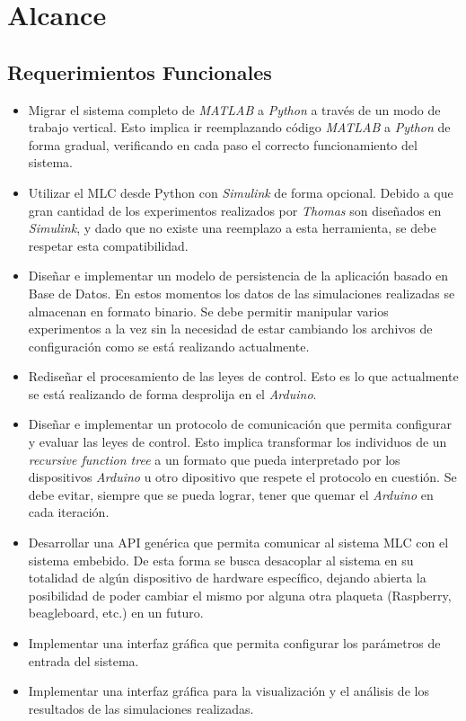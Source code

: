 \documentclass[a4paper,10pt]{article}
\begin{document}
    \newpage
    \section{Alcance}
    \subsection{Requerimientos Funcionales} \label{sec:functional}
        \begin{itemize}
            \item Migrar el sistema completo de \textit{MATLAB} a \textit{Python} a través de un modo de trabajo vertical. Esto implica
            ir reemplazando código \textit{MATLAB} a \textit{Python} de forma gradual, verificando en cada paso el correcto funcionamiento
            del sistema.
            \item Utilizar el MLC desde Python con \textit{Simulink} de forma opcional. Debido a que gran cantidad de los experimentos
            realizados por \textit{Thomas} son diseñados en \textit{Simulink}, y dado que no existe una reemplazo a esta herramienta, se
            debe respetar esta compatibilidad.
            \item Diseñar e implementar un modelo de persistencia de la aplicación basado en Base de Datos. En estos momentos los datos
            de las simulaciones realizadas se almacenan en formato binario. Se debe permitir manipular varios experimentos a la vez
            sin la necesidad de estar cambiando los archivos de configuración como se está realizando actualmente.
            \item Rediseñar el procesamiento de las leyes de control. Esto es lo que actualmente se está realizando de forma desprolija
            en el \textit{Arduino}.
            \item Diseñar e implementar un protocolo de comunicación que permita configurar y evaluar las leyes de control. Esto implica
            transformar los individuos de un \textit{recursive function tree} a un formato que pueda interpretado por los dispositivos
            \textit{Arduino} u otro dipositivo que respete el protocolo en cuestión. Se debe evitar, siempre que se pueda lograr, tener
            que quemar el \textit{Arduino} en cada iteración.
            \item Desarrollar una API genérica que permita comunicar al sistema MLC con el sistema embebido. De esta forma se busca
            desacoplar al sistema en su totalidad de algún dispositivo de hardware específico, dejando abierta la posibilidad de poder
            cambiar el mismo por alguna otra plaqueta (Raspberry, beagleboard, etc.) en un futuro.
            \item Implementar una interfaz gráfica que permita configurar los parámetros de entrada del sistema.
            \item Implementar una interfaz gráfica para la visualización y el análisis de los resultados de las simulaciones realizadas.
        \end{itemize}
\end{document}

